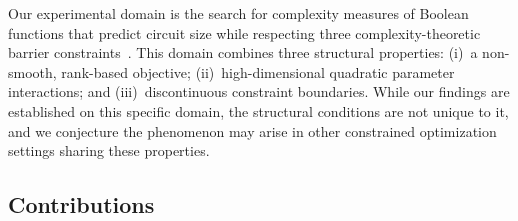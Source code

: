 \documentclass[twoside]{article}
\begin{document}
Our experimental domain is the search for complexity measures of Boolean
functions that predict circuit size while respecting three complexity-theoretic
barrier constraints~\citep{razborov1997natural,baker1975relativizations,aaronson2008algebrization}.
This domain combines three structural properties:
(i)~a non-smooth, rank-based objective;
(ii)~high-dimensional quadratic parameter interactions; and
(iii)~discontinuous constraint boundaries.
While our findings are established on this specific domain, the structural
conditions are not unique to it, and we conjecture the phenomenon may arise in
other constrained optimization settings sharing these properties.

\subsection{Contributions}
\end{document}
